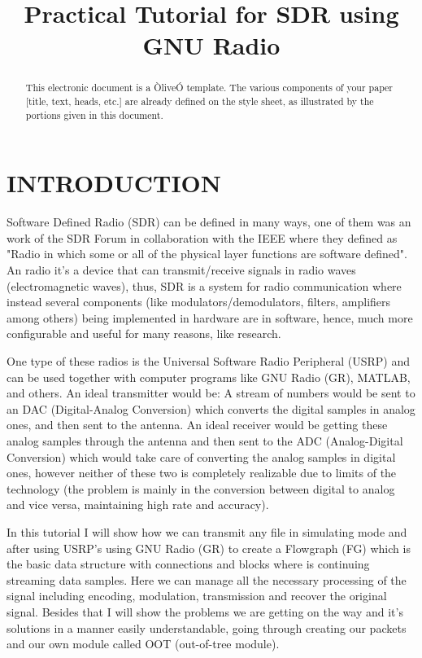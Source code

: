 \documentclass[a4paper, 10pt, conference]{ieeeconf}      %
\title{\LARGE \bf
Practical Tutorial for SDR using GNU Radio
}
\author{}
\begin{document}
\maketitle
\thispagestyle{empty}
\pagestyle{empty}


\begin{abstract}

This electronic document is a ÒliveÓ template. The various components of your paper [title, text, heads, etc.] are already defined on the style sheet, as illustrated by the portions given in this document.

\end{abstract}

\section{INTRODUCTION}

Software Defined Radio (SDR) can be defined in many ways, one of them was an work of the SDR Forum in collaboration with the IEEE where they defined as "Radio in which some or all of the physical layer functions are software defined". An radio it's a device that can transmit/receive signals in radio waves (electromagnetic waves), thus, SDR is a system for radio communication where instead several components (like modulators/demodulators, filters, amplifiers among others) being implemented in hardware are in software, hence, much more configurable and useful for many reasons, like research. 

One type of these radios is the Universal Software Radio Peripheral (USRP) and can be used together with computer programs like GNU Radio (GR), MATLAB, and others. An ideal transmitter would be: A stream of numbers would be sent to an DAC (Digital-Analog Conversion) which converts the digital samples in analog ones, and then sent to the antenna. An ideal receiver would be getting these
analog samples through the antenna and then sent to the ADC (Analog-Digital Conversion) which would take care of converting the analog samples in digital ones, however neither of these two is completely realizable due to limits of the technology (the problem is mainly in the conversion between digital to analog and vice versa, maintaining high rate and accuracy). 

In this tutorial I will show how we can transmit any file in simulating mode and after using USRP's using GNU Radio (GR) to create a Flowgraph (FG) which is the basic data structure with connections and blocks where is continuing streaming data samples. Here we can manage all the necessary processing of the signal including encoding, modulation, transmission and recover the original signal. Besides that I will show the problems we are getting on the way and it's solutions in a manner easily understandable, going through creating our packets and our own module called OOT (out-of-tree module).
\end{document}
